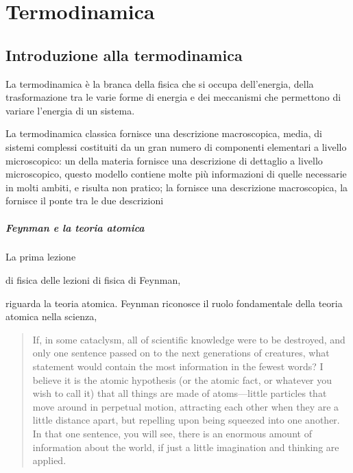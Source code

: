 \documentclass[letterpaper,10pt,italian]{jupyterBook}
\begin{document}
\part{Termodinamica}

\sphinxstepscope


\chapter{Introduzione alla termodinamica}
\label{\detokenize{ch/thermodynamics/foundation:introduzione-alla-termodinamica}}\label{\detokenize{ch/thermodynamics/foundation:physics-hs-thermodynamics-intro}}\label{\detokenize{ch/thermodynamics/foundation::doc}}
\sphinxAtStartPar
La termodinamica è la branca della fisica che si occupa dell’energia, della trasformazione tra le varie forme di energia e dei meccanismi che permettono di variare l’energia di un sistema.

\sphinxAtStartPar
La termodinamica classica fornisce una descrizione macroscopica, media, di sistemi complessi costituiti da un gran numero di componenti elementari a livello microscopico: un  della materia fornisce una descrizione di dettaglio a livello microscopico, questo modello contiene molte più informazioni di quelle necessarie in molti ambiti, e risulta non pratico; la  fornisce una descrizione macroscopica, la  fornisce il ponte tra le due descrizioni
\subsubsection*{Feynman e la teoria atomica}

\sphinxAtStartPar
La prima lezione%
\begin{footnote}[1]\sphinxAtStartFootnote
{}
%
\end{footnote} di fisica delle lezioni di fisica di Feynman,  %
\begin{footnote}[2]\sphinxAtStartFootnote
{}
%
\end{footnote} riguarda la teoria atomica. Feynman riconosce il ruolo fondamentale della teoria atomica nella scienza,
\begin{quote}

\sphinxAtStartPar
If, in some cataclysm, all of scientific knowledge were to be destroyed, and only one sentence passed on to the next generations of creatures, what statement would contain the most information in the fewest words? I believe it is the atomic hypothesis (or the atomic fact, or whatever you wish to call it) that all things are made of atoms—little particles that move around in perpetual motion, attracting each other when they are a little distance apart, but repelling upon being squeezed into one another. In that one sentence, you will see, there is an enormous amount of information about the world, if just a little imagination and thinking are applied.
\end{quote}
\end{document}
